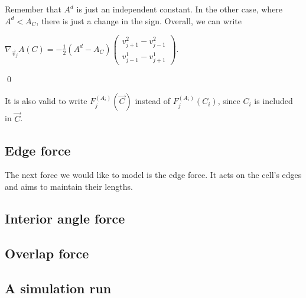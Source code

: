 \begin{proposition}
	Remember that $A^d$ is just an independent constant. 
	In the other case, where $A^d < A_{C}$, there is just a change in the sign. 
	Overall, we can write 
\begin{center}
	$
	\nabla_{\vec{v}_j} A(C) = - \frac{1}{2} (A^d - A_{C}) \begin{pmatrix}
		v_{j+1}^2 - v_{j-1}^2  \\[0.5em]
	   v_{j-1}^1  - v_{j+1}^1 
  	\end{pmatrix}.
	$
\end{center}

	\qed
\end{proposition}
It is also valid to write $F_{j}^{(A_i)}(\vec{C})$ instead of $F_{j}^{(A_i)}(C_i)$, since $C_i$ is included in $\vec{C}$. 




    
\subsection{Edge force}
The next force we would like to model is the edge force. 
It acts on the cell's edges and aims to maintain their lengths.


\subsection{Interior angle force}

\subsection{Overlap force}

\subsection{A simulation run}
